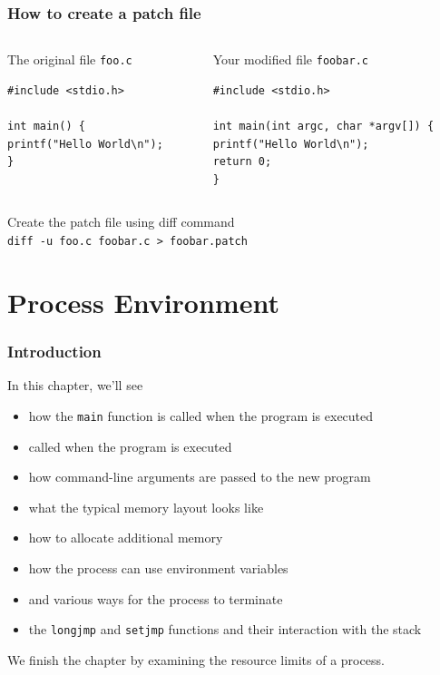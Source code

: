 \documentclass[newPxFont,sthlmFooter,nooffset]{beamer}
\begin{document}
\begin{frame}[containsverbatim,t]
  \frametitle{How to create a patch file}
\begin{columns}[t]
\begin{column}{0.45\textwidth}
The original file \texttt{foo.c}
\begin{lstlisting}
#include <stdio.h> 

int main() {
printf("Hello World\n");
}  
\end{lstlisting}
\end{column}
\begin{column}{0.45\textwidth}
Your modified file \texttt{foobar.c}
\begin{lstlisting}
#include <stdio.h>

int main(int argc, char *argv[]) {
printf("Hello World\n");
return 0;
} 
\end{lstlisting}
\end{column}
\end{columns}

Create the patch file using diff command \\ \texttt{diff -u foo.c foobar.c > foobar.patch }

{\footnotesize

}
\end{frame}


\section{Process Environment}

\begin{frame}[t]
  \frametitle{Introduction}
In this chapter, we'll see
\begin{itemize}
\item how the \texttt{main} function is called when the program is executed
\item called when the program is executed
\item how command-line arguments are passed to the new program
\item what the typical memory layout looks like
\item how to allocate additional memory
\item how the process can use environment variables
\item and various ways for the process to terminate
\item the \texttt{longjmp} and \texttt{setjmp} functions and their interaction with the stack
\end{itemize}
We finish the chapter by examining the resource limits of a process.
\end{frame}
\end{document}
